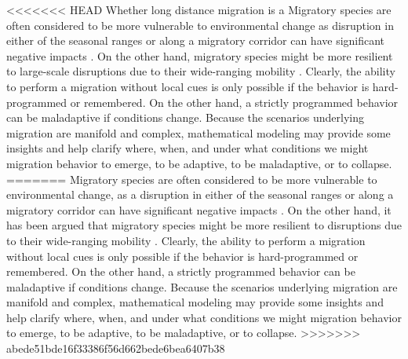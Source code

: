 \documentclass[utf8]{frontiersSCNS} %
\begin{document}
<<<<<<< HEAD
Whether long distance migration is a Migratory species are often considered to be more vulnerable to environmental change as disruption in either of the seasonal ranges or along a migratory corridor can have significant negative impacts \citep{Wilcove2008, Kauffman2021}. On the other hand, migratory species might be more resilient to large-scale disruptions due to their wide-ranging mobility \citep{Robinson2009}. Clearly, the ability to perform a migration without local cues is only possible if the behavior is hard-programmed or remembered. On the other hand, a strictly programmed behavior can be maladaptive if conditions change. Because the scenarios underlying migration are manifold and complex, mathematical modeling may provide some insights and help clarify where, when, and under what conditions we might migration behavior to emerge, to be adaptive, to be maladaptive, or to collapse.
=======
Migratory species are often considered to be more vulnerable to environmental change, as a disruption in either of the seasonal ranges or along a migratory corridor can have significant negative impacts \citep{Wilcove2008, Kauffman2021}. On the other hand, it has been argued that migratory species might be more resilient to disruptions due to their wide-ranging mobility \citep{Robinson2009}. Clearly, the ability to perform a migration without local cues is only possible if the behavior is hard-programmed or remembered. On the other hand, a strictly programmed behavior can be maladaptive if conditions change. Because the scenarios underlying migration are manifold and complex, mathematical modeling may provide some insights and help clarify where, when, and under what conditions we might migration behavior to emerge, to be adaptive, to be maladaptive, or to collapse.
>>>>>>> abede51bde16f33386f56d662bede6bea6407b38
\end{document}
